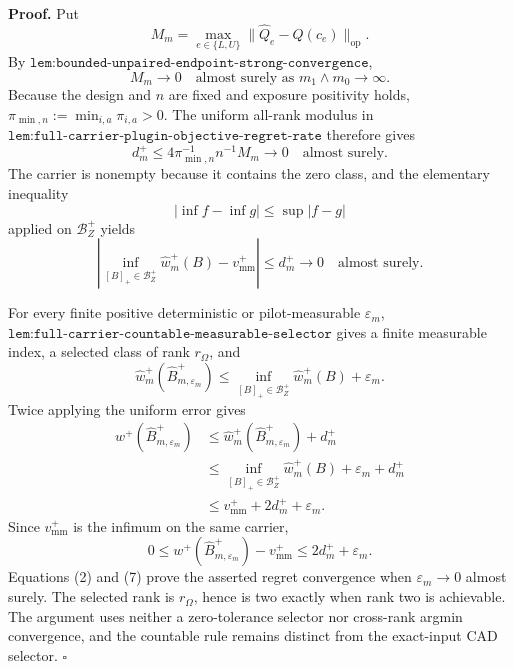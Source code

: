 \textbf{Proof.}
Put
\[
M_m=\max_{e\in\{L,U\}}\lVert\widehat Q_e-Q(c_e)\rVert_{\mathrm{op}}.
\]
By \(\texttt{lem:bounded-unpaired-endpoint-strong-convergence}\),
\[
M_m\longrightarrow0
\quad\text{almost surely as }m_1\wedge m_0\to\infty.
\tag{1}
\]
Because the design and \(n\) are fixed and exposure positivity holds,
\(\pi_{\min,n}:=\min_{i,a}\pi_{i,a}>0\).  The uniform all-rank modulus in \(\texttt{lem:full-carrier-plugin-objective-regret-rate}\) therefore gives
\[
d_m^+\le4\pi_{\min,n}^{-1}n^{-1}M_m\longrightarrow0
\quad\text{almost surely}.
\tag{2}
\]
The carrier is nonempty because it contains the zero class, and the elementary inequality
\[
|\inf f-\inf g|\le\sup|f-g|
\tag{3}
\]
applied on \(\mathcal B_Z^+\) yields
\[
\left|\inf_{[B]_+\in\mathcal B_Z^+}\widehat w_m^+(B)-v_{\mathrm{mm}}^+\right|
\le d_m^+\longrightarrow0
\quad\text{almost surely}.
\tag{4}
\]

For every finite positive deterministic or pilot-measurable \(\varepsilon_m\), \(\texttt{lem:full-carrier-countable-measurable-selector}\) gives a finite measurable index, a selected class of rank \(r_\Omega\), and
\[
\widehat w_m^+(\widehat B_{m,\varepsilon_m}^+)
\le\inf_{[B]_+\in\mathcal B_Z^+}\widehat w_m^+(B)+\varepsilon_m.
\tag{5}
\]
Twice applying the uniform error gives
\[
\begin{aligned}
w^+(\widehat B_{m,\varepsilon_m}^+)
&\le\widehat w_m^+(\widehat B_{m,\varepsilon_m}^+)+d_m^+\\
&\le\inf_{[B]_+\in\mathcal B_Z^+}\widehat w_m^+(B)+\varepsilon_m+d_m^+\\
&\le v_{\mathrm{mm}}^++2d_m^++\varepsilon_m.
\end{aligned}
\tag{6}
\]
Since \(v_{\mathrm{mm}}^+\) is the infimum on the same carrier,
\[
0\le w^+(\widehat B_{m,\varepsilon_m}^+)-v_{\mathrm{mm}}^+
\le2d_m^++\varepsilon_m.
\tag{7}
\]
Equations (2) and (7) prove the asserted regret convergence when \(\varepsilon_m\to0\) almost surely.  The selected rank is \(r_\Omega\), hence is two exactly when rank two is achievable.  The argument uses neither a zero-tolerance selector nor cross-rank argmin convergence, and the countable rule remains distinct from the exact-input CAD selector. \(\square\)